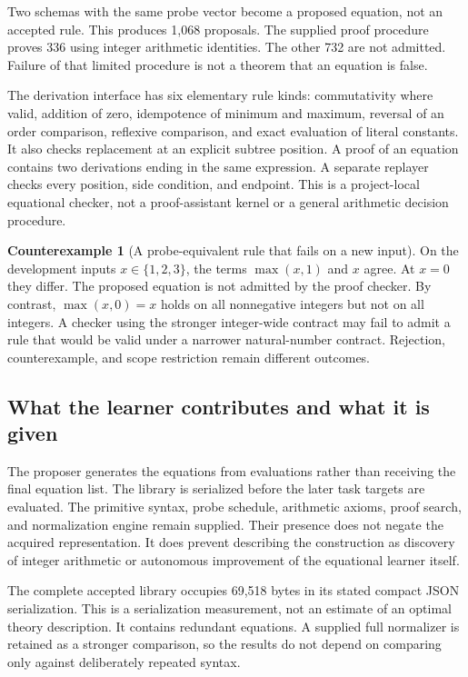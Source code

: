 \documentclass[11pt,letterpaper]{article}
\theoremstyle{plain}
\theoremstyle{definition}
\newtheorem{counterexample}[theorem]{Counterexample}
\begin{document}
Two schemas with the same probe vector become a proposed equation, not an accepted rule. This produces 1,068 proposals. The supplied proof procedure proves 336 using integer arithmetic identities. The other 732 are not admitted. Failure of that limited procedure is not a theorem that an equation is false.

The derivation interface has six elementary rule kinds: commutativity where valid, addition of zero, idempotence of minimum and maximum, reversal of an order comparison, reflexive comparison, and exact evaluation of literal constants. It also checks replacement at an explicit subtree position. A proof of an equation contains two derivations ending in the same expression. A separate replayer checks every position, side condition, and endpoint. This is a project-local equational checker, not a proof-assistant kernel or a general arithmetic decision procedure.

\begin{counterexample}[A probe-equivalent rule that fails on a new input]\label{ex:probe-equation}
On the development inputs $x\in\{1,2,3\}$, the terms $\max(x,1)$ and $x$ agree. At $x=0$ they differ. The proposed equation is not admitted by the proof checker. By contrast, $\max(x,0)=x$ holds on all nonnegative integers but not on all integers. A checker using the stronger integer-wide contract may fail to admit a rule that would be valid under a narrower natural-number contract. Rejection, counterexample, and scope restriction remain different outcomes.
\end{counterexample}

\subsection{What the learner contributes and what it is given}
The proposer generates the equations from evaluations rather than receiving the final equation list. The library is serialized before the later task targets are evaluated. The primitive syntax, probe schedule, arithmetic axioms, proof search, and normalization engine remain supplied. Their presence does not negate the acquired representation. It does prevent describing the construction as discovery of integer arithmetic or autonomous improvement of the equational learner itself.

The complete accepted library occupies 69,518 bytes in its stated compact JSON serialization. This is a serialization measurement, not an estimate of an optimal theory description. It contains redundant equations. A supplied full normalizer is retained as a stronger comparison, so the results do not depend on comparing only against deliberately repeated syntax.
\end{document}
